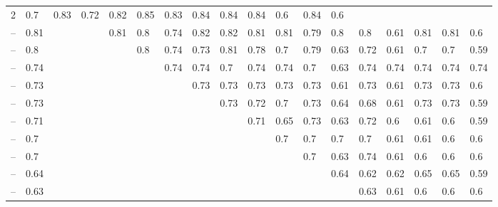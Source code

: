 \documentclass[11pt]{article} %
\begin{document}
\begin{table}[H]
\begin{adjustbox}{max width=\textwidth,max totalheight=\textheight,keepaspectratio}
\begin{tabular}{lHHHHHHHHHHHHHHHHH}
2   & 0.7    & 0.83   & 0.72   & 0.82   & 0.85   & 0.83    & 0.84    & 0.84    & 0.84    & 0.6     & 0.84    & 0.6     \\
	 -- \NMIAMg            & 0.81                     &        &        & 0.81   & 0.8    & 0.74   & 0.82   & 0.82   & 0.81   & 0.81   & 0.79    & 0.8     & 0.8     & 0.61    & 0.81    & 0.81    & 0.6     \\
	 -- \NMIA              & 0.8                      &        &        &        & 0.8    & 0.74   & 0.73   & 0.81   & 0.78   & 0.7    & 0.79    & 0.63    & 0.72    & 0.61    & 0.7     & 0.7     & 0.59    \\
	 -- \OneMSevILUThreeMg & 0.74                     &        &        &        &        & 0.74   & 0.74   & 0.7    & 0.74   & 0.74   & 0.7     & 0.63    & 0.74    & 0.74    & 0.74    & 0.74    & 0.74    \\
	 -- \NMIAMgCE          & 0.73                     &        &        &        &        &        & 0.73   & 0.73   & 0.73   & 0.73   & 0.73    & 0.61    & 0.73    & 0.61    & 0.73    & 0.73    & 0.6     \\
	 -- \NAIMg             & 0.73                     &        &        &        &        &        &        & 0.73   & 0.72   & 0.7    & 0.73    & 0.64    & 0.68    & 0.61    & 0.73    & 0.73    & 0.59    \\
	 -- \BzCNMg            & 0.71                     &        &        &        &        &        &        &        & 0.71   & 0.65   & 0.73    & 0.63    & 0.72    & 0.6     & 0.61    & 0.6     & 0.59    \\
	 -- \OneMSevMgCE       & 0.7                      &        &        &        &        &        &        &        &        & 0.7    & 0.7     & 0.7     & 0.7     & 0.61    & 0.61    & 0.6     & 0.6     \\
	 -- \CMCTMg           & 0.7                      &        &        &        &        &        &        &        &        &        & 0.7     & 0.63    & 0.74    & 0.61    & 0.6     & 0.6     & 0.6     \\
	 -- \OneMSevILUThree  & 0.64                     &        &        &        &        &        &        &        &        &        &         & 0.64    & 0.62    & 0.62    & 0.65    & 0.65    & 0.59    \\
	 -- \DMSMg            & 0.63                     &        &        &        &        &        &        &        &        &        &         &         & 0.63    & 0.61    & 0.6     & 0.6     & 0.6     \\

\end{tabular}
\end{adjustbox}
\end{table}
\end{document}
